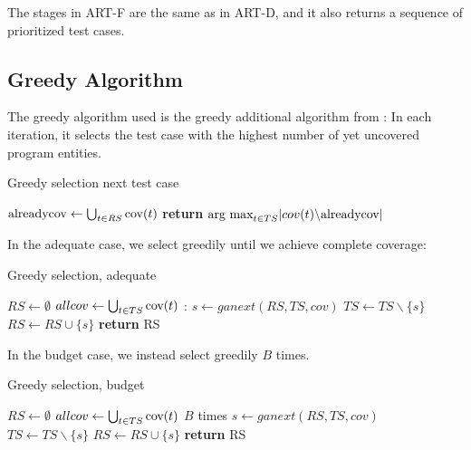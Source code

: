The stages in ART-F are the same as in ART-D, and it also returns a
sequence of prioritized test cases.

\subsection{Greedy Algorithm}

The greedy algorithm used is the greedy additional algorithm from
\cite{rothermel2001prioritizing}: In each iteration, it selects the test
case with the highest number of yet uncovered program entities.

\begin{algorithm}
\caption[Greedy selection next test case]{Greedy selection next test case}\label{code:ganext}
\begin{algorithmic}
	\State $\hbox{alreadycov} \gets \bigcup_{t \in RS} \hbox{cov}(t)$
	\State \textbf{return} $\hbox{arg max}_{t \in TS} |cov(t)\backslash \hbox{alreadycov}|$
\EndFunction
\end{algorithmic}
\end{algorithm}

In the adequate case, we select greedily until we achieve complete
coverage:

\begin{algorithm}
\caption[Greedy selection, adequate]{Greedy selection, adequate}\label{code:gaadequate}
\begin{algorithmic}
	\State $RS \gets \emptyset$
	\State $allcov \gets \bigcup_{t \in TS} \hbox{cov}(t)$
	:
		\State $s \gets ganext(RS, TS, cov)$
		\State $TS \gets TS \backslash \{s\}$
		\State $RS \gets RS \cup \{s\}$
	\EndWhile
	\State \textbf{return} RS
\EndFunction
\end{algorithmic}
\end{algorithm}

In the budget case, we instead select greedily $B$ times.

\begin{algorithm}
\caption[Greedy selection, budget]{Greedy selection, budget}\label{code:gabudget}
\begin{algorithmic}
	\State $RS \gets \emptyset$
	\State $allcov \gets \bigcup_{t \in TS} \hbox{cov}(t)$
	\For $B$ times
		\State $s \gets ganext(RS, TS, cov)$
		\State $TS \gets TS \backslash \{s\}$
		\State $RS \gets RS \cup \{s\}$
	\EndFor
	\State \textbf{return} RS
\EndFunction
\end{algorithmic}
\end{algorithm}
